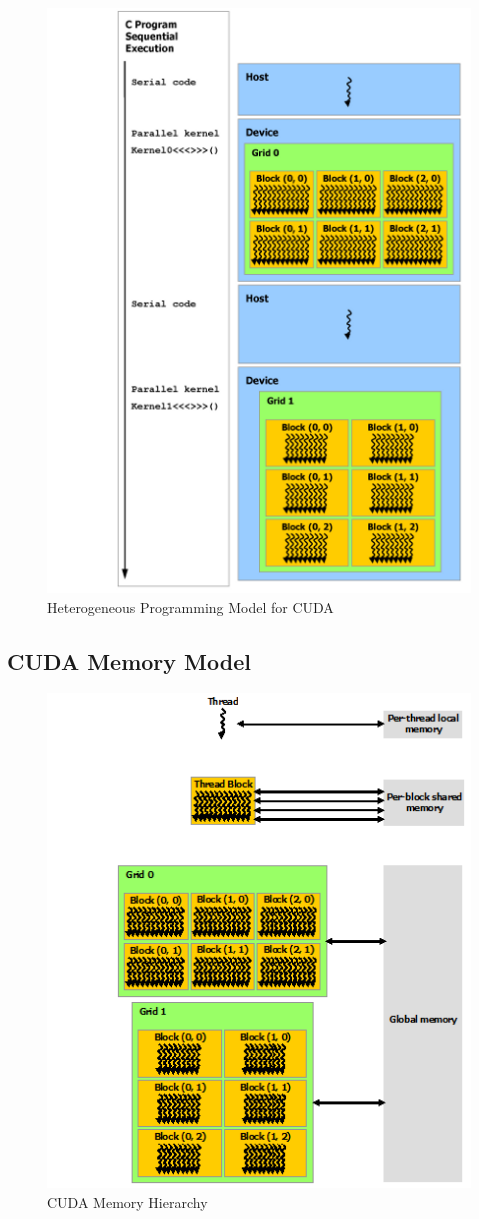 \begin{figure}[htb]
    \centering
    \includegraphics[width=0.65\linewidth]{Figures/heterogeneous-programming.png}
	\caption{Heterogeneous Programming Model for CUDA}
	\label{fig:heteropro}
\end{figure}

\subsection{CUDA Memory Model}
\label{sec:cudamemmodel}

\begin{figure}[htb]
    \centering
    \includegraphics[width=0.65\linewidth]{Figures/memory-hierarchy.png}
	\caption{CUDA Memory Hierarchy}
	\label{fig:memhierarchy}
\end{figure}

